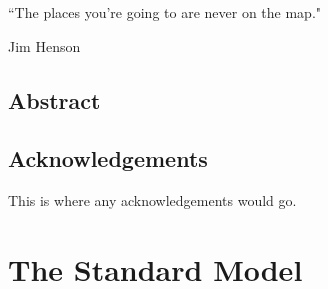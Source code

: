 \documentclass[oneside, letterpaper, 12pt, oldfontcommands]{memoir}
\begin{document}
\modulolinenumbers[1]
\linenumbers
\frontmatter


\thetitlepage
\clearpage
``The places you're going to are never on the map."

Jim Henson
\thecopyrightpage
\cleardoublepage

\setcounter{page}{1}

\section{Abstract}
\uwabstract
\cleardoublepage

\section{Acknowledgements}
This is where any acknowledgements would go.
\clearpage

\tableofcontents* %
 \listoffigures*  %
 \listoftables   %

\mainmatter

\chapter{The Standard Model}





 
 
 
 
 
 
 









%
%


\end{document}
